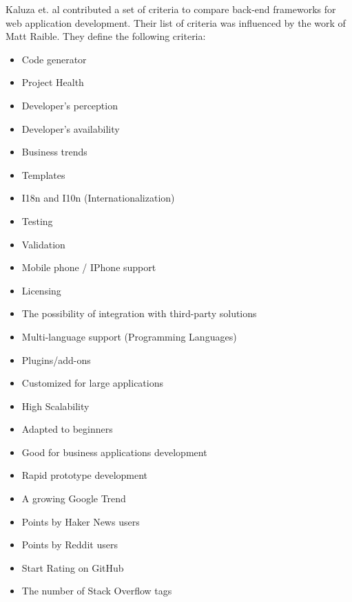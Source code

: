 Kaluza et. al contributed a set of criteria to compare back-end frameworks for web application development. Their list of criteria was influenced by the work of Matt Raible. They define the following criteria: 
\begin{itemize}
    \item Code generator
    \item Project Health
    \item Developer's perception
    \item Developer's availability
    \item Business trends
    \item Templates
    \item I18n and I10n (Internationalization)
    \item Testing
    \item Validation
    \item Mobile phone / IPhone support
    \item Licensing
    \item The possibility of integration with third-party solutions
    \item Multi-language support (Programming Languages)
    \item Plugins/add-ons
    \item Customized for large applications
    \item High Scalability
    \item Adapted to beginners
    \item Good for business applications development
    \item Rapid prototype development
    \item A growing Google Trend
    \item Points by Haker News users
    \item Points by Reddit users
    \item Start Rating on GitHub
    \item The number of Stack Overflow tags
\end{itemize}
